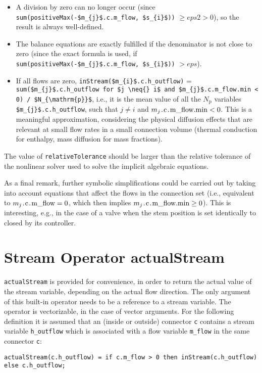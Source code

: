 \begin{nonnormative}
\begin{itemize}
\item
  A division by zero can no longer occur (since \lstinline!sum(positiveMax(-$m_{j}$.c.m_flow, $s_{i}$))! $\geq \mathit{eps2} > 0$),
  so the result is always well-defined.
\item
  The balance equations are exactly fulfilled if the denominator is not close to zero (since the exact formula is used, if
  \lstinline!sum(positiveMax(-$m_{j}$.c.m_flow, $s_{i}$))! $> \mathit{eps}$).
\item
  If all flows are zero,
  \lstinline!inStream($m_{i}$.c.h_outflow)! =
  \lstinline!sum($m_{j}$.c.h_outflow for $j \neq{} i$ and $m_{j}$.c.m_flow.min < 0) / $N_{\mathrm{p}}$!,
  i.e., it is the mean value of all the $N_{\mathrm{p}}$ variables
  \lstinline!$m_{j}$.c.h_outflow!, such that $j \neq i$ and
  $m_{j}\text{\lstinline!.c.m_flow.min!} < 0$. This is a
  meaningful approximation, considering the physical diffusion effects
  that are relevant at small flow rates in a small connection volume
  (thermal conduction for enthalpy, mass diffusion for mass fractions).
\end{itemize}

The value of \lstinline!relativeTolerance! should be larger than the relative
tolerance of the nonlinear solver used to solve the implicit algebraic
equations.

As a final remark, further symbolic simplifications could be
carried out by taking into account equations that affect the flows in
the connection set (i.e., equivalent to $m_{j}\text{\lstinline!.c.m_flow!} =
0$, which then implies $m_{j}\text{\lstinline!.c.m_flow.min!} \geq 0$). This is interesting, e.g., in the case of a valve when the stem
position is set identically to closed by its controller.
\end{nonnormative}

\section{Stream Operator actualStream}\label{stream-operator-actualstream}

\lstinline!actualStream! is provided for convenience, in
order to return the actual value of the stream variable, depending on
the actual flow direction. The only argument of this built-in operator
needs to be a reference to a stream variable. The operator is
vectorizable, in the case of vector arguments. For the following
definition it is assumed that an (inside or outside) connector \lstinline!c!
contains a stream variable \lstinline!h_outflow! which is associated with a flow
variable \lstinline!m_flow! in the same connector \lstinline!c!:
\begin{lstlisting}[language=modelica]
actualStream(c.h_outflow) = if c.m_flow > 0 then inStream(c.h_outflow) else c.h_outflow;
\end{lstlisting}

